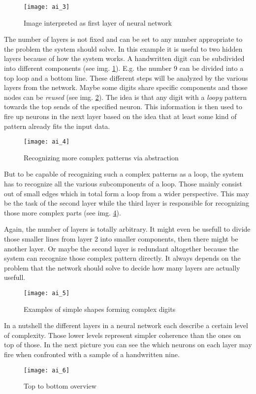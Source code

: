 \documentclass{article}
\begin{document}
\begin{figure}[h]
	\centering
	\texttt{[image: ai\_3]}
	\caption{Image interpreted as first layer of neural network}
	\label{ai_3}
\end{figure}

The number of layers is not fixed and can be set to any number appropriate to the problem the system should solve. In this example it is useful to two hidden layers because of how the system works. A handwritten digit can be subdivided into different components (see img. \ref{ai_3}). E.g. the number 9 can be divided into a top loop and a bottom line. These different steps will be analyzed by the various layers from the network. Maybe some digits share specific components and those nodes can be \textit{reused} (see img. \ref{ai_4}). The idea is that any digit with a \textit{loopy} pattern towards the top sends of the specified neuron. This information is then used to fire up neurons in the next layer based on the idea that at least some kind of pattern already fits the input data.

\begin{figure}[h]
	\centering
	\texttt{[image: ai\_4]}
	\caption{Recognizing more complex patterns via abstraction}
	\label{ai_4}
\end{figure}

But to be capable of recognizing such a complex patterns as a loop, the system has to recognize all the various subcomponents of a loop. Those mainly consist out of small edges which in total form a loop from a wider perspective. This may be the task of the second layer while the third layer is responsible for recognizing those more complex parts (see img. \ref{ai_6}). 

Again, the number of layers is totally arbitrary. It might even be usefull to divide those smaller lines from layer 2 into smaller components, then there might be another layer. Or maybe the second layer is redundant altogether because the system can recognize those complex pattern directly. It always depends on the problem that the network should solve to decide how many layers are actually usefull.

\begin{figure}[h]
	\centering
	\texttt{[image: ai\_5]}
	\caption{Examples of simple shapes forming complex digits}
	\label{ai_5}
\end{figure}

In a nutshell the different layers in a neural network each describe a certain level of complexity. Those lower levels represent simpler coherence than the ones on top of those. In the next picture you can see the which neurons on each layer may fire when confronted with a sample of a handwritten nine.

\begin{figure}[h]
	\centering
	\texttt{[image: ai\_6]}
	\caption{Top to bottom overview}
	\label{ai_6}
\end{figure}
\end{document}

